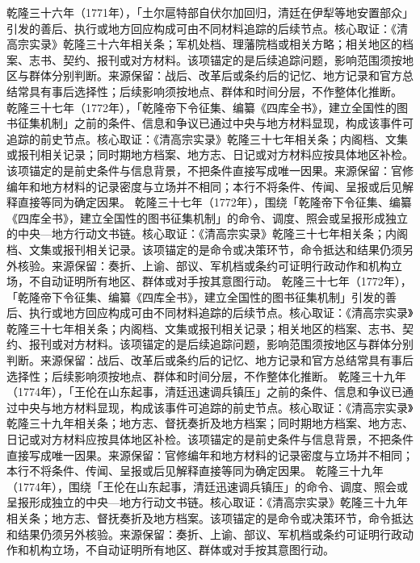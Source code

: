 乾隆三十六年（1771年），「土尔扈特部自伏尔加回归，清廷在伊犁等地安置部众」引发的善后、执行或地方回应构成可由不同材料追踪的后续节点。核心取证：《清高宗实录》乾隆三十六年相关条；军机处档、理藩院档或相关方略；相关地区的档案、志书、契约、报刊或对方材料。该项锚定的是后续追踪问题，影响范围须按地区与群体分别判断。来源保留：战后、改革后或条约后的记忆、地方记录和官方总结常具有事后选择性；后续影响须按地点、群体和时间分层，不作整体化推断。
乾隆三十七年（1772年），「乾隆帝下令征集、编纂《四库全书》，建立全国性的图书征集机制」之前的条件、信息和争议已通过中央与地方材料显现，构成该事件可追踪的前史节点。核心取证：《清高宗实录》乾隆三十七年相关条；内阁档、文集或报刊相关记录；同时期地方档案、地方志、日记或对方材料应按具体地区补检。该项锚定的是前史条件与信息背景，不把条件直接写成唯一因果。来源保留：官修编年和地方材料的记录密度与立场并不相同；本行不将条件、传闻、呈报或后见解释直接等同为确定因果。
乾隆三十七年（1772年），围绕「乾隆帝下令征集、编纂《四库全书》，建立全国性的图书征集机制」的命令、调度、照会或呈报形成独立的中央—地方行动文书链。核心取证：《清高宗实录》乾隆三十七年相关条；内阁档、文集或报刊相关记录。该项锚定的是命令或决策环节，命令抵达和结果仍须另外核验。来源保留：奏折、上谕、部议、军机档或条约可证明行政动作和机构立场，不自动证明所有地区、群体或对手按其意图行动。
乾隆三十七年（1772年），「乾隆帝下令征集、编纂《四库全书》，建立全国性的图书征集机制」引发的善后、执行或地方回应构成可由不同材料追踪的后续节点。核心取证：《清高宗实录》乾隆三十七年相关条；内阁档、文集或报刊相关记录；相关地区的档案、志书、契约、报刊或对方材料。该项锚定的是后续追踪问题，影响范围须按地区与群体分别判断。来源保留：战后、改革后或条约后的记忆、地方记录和官方总结常具有事后选择性；后续影响须按地点、群体和时间分层，不作整体化推断。
乾隆三十九年（1774年），「王伦在山东起事，清廷迅速调兵镇压」之前的条件、信息和争议已通过中央与地方材料显现，构成该事件可追踪的前史节点。核心取证：《清高宗实录》乾隆三十九年相关条；地方志、督抚奏折及地方档案；同时期地方档案、地方志、日记或对方材料应按具体地区补检。该项锚定的是前史条件与信息背景，不把条件直接写成唯一因果。来源保留：官修编年和地方材料的记录密度与立场并不相同；本行不将条件、传闻、呈报或后见解释直接等同为确定因果。
乾隆三十九年（1774年），围绕「王伦在山东起事，清廷迅速调兵镇压」的命令、调度、照会或呈报形成独立的中央—地方行动文书链。核心取证：《清高宗实录》乾隆三十九年相关条；地方志、督抚奏折及地方档案。该项锚定的是命令或决策环节，命令抵达和结果仍须另外核验。来源保留：奏折、上谕、部议、军机档或条约可证明行政动作和机构立场，不自动证明所有地区、群体或对手按其意图行动。
